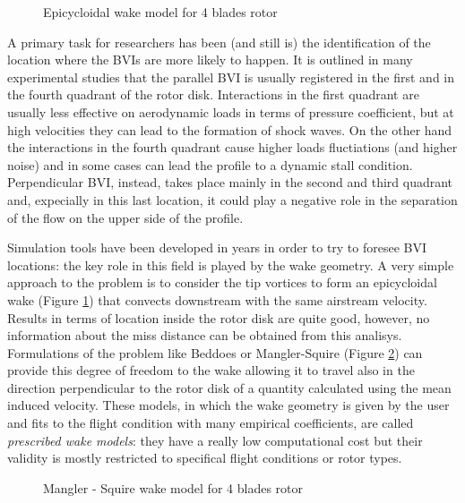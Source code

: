 \begin{figure}
	\centering
	\caption{Epicycloidal wake model for 4 blades rotor}
	\label{epiwake}
\end{figure}

A primary task for researchers has been (and still is) the identification of the location where the BVIs are more likely to happen. It is outlined in many experimental studies that the parallel BVI is usually registered in the first and in the fourth quadrant of the rotor disk. Interactions in the first quadrant are usually less effective on aerodynamic loads in terms of pressure coefficient, but at high velocities they can lead to the formation of shock waves. On the other hand the interactions in the fourth quadrant cause higher loads fluctiations (and higher noise) and in some cases can lead the profile to a dynamic stall condition. Perpendicular BVI, instead, takes place mainly in the second and third quadrant and, expecially in this last location, it could play a negative role in the separation of the flow on the upper side of the profile.

Simulation tools have been developed in years in order to try to foresee BVI locations: the key role in this field is played by the wake geometry. 
A very simple approach to the problem is to consider the tip vortices to form an epicycloidal wake (Figure \ref{epiwake}) that convects downstream with the same airstream velocity. Results in terms of location inside the rotor disk are quite good, however, no information about the miss distance can be obtained from this analisys. Formulations of the problem like Beddoes or Mangler-Squire (Figure \ref{MSwake}) can provide this degree of freedom to the wake allowing it to travel also in the direction perpendicular to the rotor disk of a quantity calculated using the mean induced velocity. These models, in which the wake geometry is given by the user and fits to the flight condition with many empirical coefficients, are called \textit{prescribed wake models}: they have a really low computational cost but their validity is mostly restricted to specifical flight conditions or rotor types. 

\begin{figure}
	\centering
	\caption{Mangler - Squire wake model for 4 blades rotor}
	\label{MSwake}
\end{figure}


